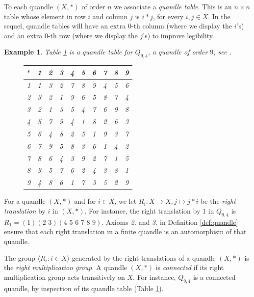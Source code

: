 \documentclass{article}
\newtheorem{example}[theorem]{Example}
\begin{document}
To each quandle $(X,\ast)$ of order $n$ we associate a \emph{quandle table}. This is an $n\times n$ table whose element in row $i$ and column $j$ is $i\ast j$, for every $i,j\in X$. In the sequel, quandle tables will have an extra $0$-th column (where we display the $i$'s) and an extra $0$-th row (where we display the $j$'s) to improve legibility.

\begin{example}\label{example:Q94}
Table \ref{table:1} is a quandle table for $Q_{9,4}$, a quandle of order $9$, see \cite{Vendramin_2}.

\begin{figure}[htbp]\centering
{\renewcommand{\arraystretch}{1.2}
\renewcommand{\tabcolsep}{6pt}
\begin{tabular}{c|c c c c c c c c c}
    $*$ & 1 & 2 & 3 & 4 & 5 & 6 & 7 & 8 & 9\\
    \hline
    1 & 1 & 3 & 2 & 7 & 8 & 9 & 4 & 5 & 6\\
    2 & 3 & 2 & 1 & 9 & 6 & 5 & 8 & 7 & 4\\
    3 & 2 & 1 & 3 & 5 & 4 & 7 & 6 & 9 & 8\\
    4 & 5 & 7 & 9 & 4 & 1 & 8 & 2 & 6 & 3\\
    5 & 6 & 4 & 8 & 2 & 5 & 1 & 9 & 3 & 7\\
    6 & 7 & 9 & 5 & 8 & 3 & 6 & 1 & 4 & 2\\
    7 & 8 & 6 & 4 & 3 & 9 & 2 & 7 & 1 & 5\\
    8 & 9 & 5 & 7 & 6 & 2 & 4 & 3 & 8 & 1\\
    9 & 4 & 8 & 6 & 1 & 7 & 3 & 5 & 2 & 9\\
\end{tabular}}
\label{table:1}
\end{figure}
\end{example}

For a quandle $(X,*)$ and for $i\in X$, we let $R_i: X\rightarrow X, j\mapsto j*i$ be the \emph{right translation} by $i$ in $(X,*)$. For instance, the right translation by $1$ in $Q_{9,4}$ is $R_1=(1)(2\,\,3)(4\,\,5\,\,6\,\,7\,\,8\,\,9)$. Axioms \textit{2.} and \textit{3.} in Definition \ref{def:quandle} ensure that each right translation in a finite quandle is an automorphism of that quandle.

The group $\langle R_i:i\in X\rangle$ generated by the right translations of a quandle $(X,*)$ is the \emph{right multiplication group}. A quandle $(X,*)$ is \emph{connected} if its right multiplication group acts transitively on $X$. For instance, $Q_{9,4}$ is a connected quandle, by inspection of its quandle table (Table \ref{table:1}).
\end{document}
